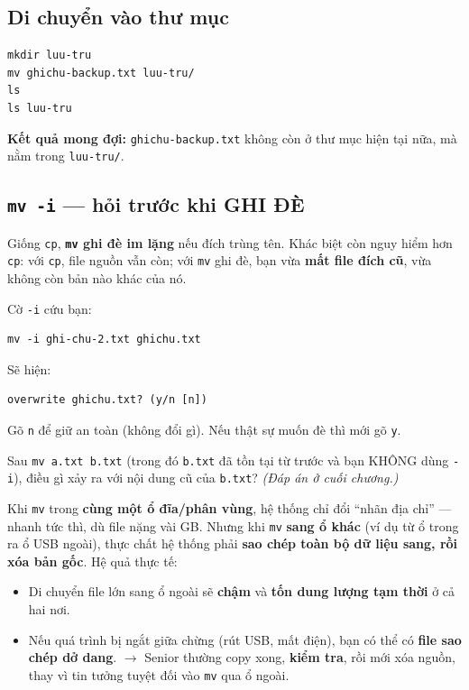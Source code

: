 \documentclass[12pt,a4paper]{article}
\newcommand{\cmd}[1]{\texttt{#1}}
\begin{document}
\subsection{Di chuyển vào thư mục}

\begin{Verbatim}
mkdir luu-tru
mv ghichu-backup.txt luu-tru/
ls
ls luu-tru
\end{Verbatim}

\textbf{Kết quả mong đợi:} \cmd{ghichu-backup.txt} không còn ở thư mục hiện tại nữa, mà nằm trong \cmd{luu-tru/}.

\subsection{\texttt{mv -i} --- hỏi trước khi GHI ĐÈ}

\begin{dangerbox}[title={Lưu ý: \texttt{mv} ghi đè im lặng}]
Giống \cmd{cp}, \textbf{\cmd{mv} ghi đè im lặng} nếu đích trùng tên. Khác biệt còn nguy hiểm hơn \cmd{cp}: với \cmd{cp}, file nguồn vẫn còn; với \cmd{mv} ghi đè, bạn vừa \textbf{mất file đích cũ}, vừa không còn bản nào khác của nó.
\end{dangerbox}

Cờ \cmd{-i} cứu bạn:

\begin{Verbatim}
mv -i ghi-chu-2.txt ghichu.txt
\end{Verbatim}

Sẽ hiện:
\begin{Verbatim}
overwrite ghichu.txt? (y/n [n])
\end{Verbatim}

Gõ \cmd{n} để giữ an toàn (không đổi gì). Nếu thật sự muốn đè thì mới gõ \cmd{y}.

\begin{checkbox}[title={Tự kiểm tra 4}]
Sau \cmd{mv a.txt b.txt} (trong đó \cmd{b.txt} đã tồn tại từ trước và bạn KHÔNG dùng \cmd{-i}), điều gì xảy ra với nội dung cũ của \cmd{b.txt}? \textit{(Đáp án ở cuối chương.)}
\end{checkbox}

\begin{seniorbox}[title={Góc Senior \#3 --- \texttt{mv} giữa hai phân vùng thực ra là ``copy + delete''}]
Khi \cmd{mv} trong \textbf{cùng một ổ đĩa/phân vùng}, hệ thống chỉ đổi ``nhãn địa chỉ'' --- nhanh tức thì, dù file nặng vài GB. Nhưng khi \cmd{mv} \textbf{sang ổ khác} (ví dụ từ ổ trong ra ổ USB ngoài), thực chất hệ thống phải \textbf{sao chép toàn bộ dữ liệu sang, rồi xóa bản gốc}. Hệ quả thực tế:

\begin{itemize}[leftmargin=1.4em]
\item Di chuyển file lớn sang ổ ngoài sẽ \textbf{chậm} và \textbf{tốn dung lượng tạm thời} ở cả hai nơi.
\item Nếu quá trình bị ngắt giữa chừng (rút USB, mất điện), bạn có thể có \textbf{file sao chép dở dang}. $\rightarrow$ Senior thường copy xong, \textbf{kiểm tra}, rồi mới xóa nguồn, thay vì tin tưởng tuyệt đối vào \cmd{mv} qua ổ ngoài.
\end{itemize}
\end{seniorbox}
\end{document}
